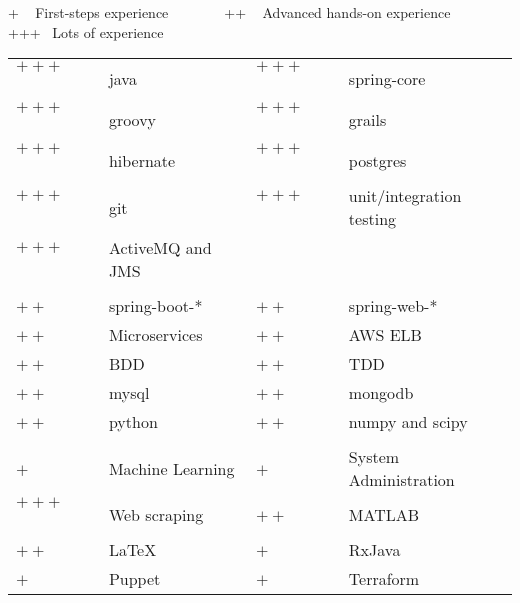 
\newcommand{\plus}{$+~$~~~~}
\newcommand{\pplus}{$++~$~~~~}
\newcommand{\ppplus}{$+++$~~~~~}
\begin{cventries}
\cventry
{+ ~ First-steps experience ~~~  ~~~ ++ ~ Advanced hands-on experience ~~~  ~~~ +++ ~Lots of experience \vspace{0.1em}} %
{} %
{} %
{} %
{ %
\setlength{\tabcolsep}{3pt}
\begin{tabular}{  l l @{\hskip 1in} l l }
           \ppplus & java & \ppplus & spring-core \\ 
           \ppplus & groovy & \ppplus & grails  \\
           \ppplus & hibernate & \ppplus & postgres  \\                      
           \ppplus & git & \ppplus & unit/integration testing  \\
		   \ppplus & ActiveMQ and JMS & & \\           
           & & & \\           
           \pplus & spring-boot-* & \pplus & spring-web-*  \\ 
           \pplus & Microservices & \pplus & AWS ELB  \\ 
           \pplus & BDD &\pplus & TDD \\ 
           \pplus & mysql &\pplus & mongodb \\ 
           \pplus & python  & \pplus & numpy and scipy \\ 
		   & & & \\
           \plus & Machine Learning &\plus & System Administration \\
           \ppplus & Web scraping & \pplus & MATLAB  \\            
           \pplus & \LaTeX & \plus & RxJava \\
		   \plus & Puppet & \plus & Terraform
\end{tabular}
}
\end{cventries}
